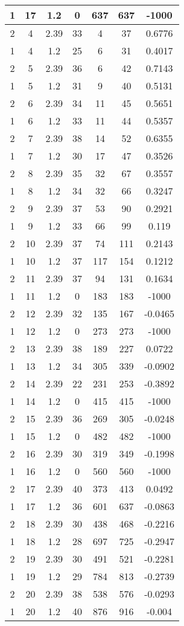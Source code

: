 \documentclass[letterpaper, 12pt]{article}
\begin{document}
\begin{longtable}{|c|c|c|c|c|c|c|}
\hline
1 & 17 & 1.2 & 0 & 637 & 637 & -1000 \\
\hline
2 & 4 & 2.39 & 33 & 4 & 37 & 0.6776 \\
\hline
1 & 4 & 1.2 & 25 & 6 & 31 & 0.4017 \\
\hline
2 & 5 & 2.39 & 36 & 6 & 42 & 0.7143 \\
\hline
1 & 5 & 1.2 & 31 & 9 & 40 & 0.5131 \\
\hline
2 & 6 & 2.39 & 34 & 11 & 45 & 0.5651 \\
\hline
1 & 6 & 1.2 & 33 & 11 & 44 & 0.5357 \\
\hline
2 & 7 & 2.39 & 38 & 14 & 52 & 0.6355 \\
\hline
1 & 7 & 1.2 & 30 & 17 & 47 & 0.3526 \\
\hline
2 & 8 & 2.39 & 35 & 32 & 67 & 0.3557 \\
\hline
1 & 8 & 1.2 & 34 & 32 & 66 & 0.3247 \\
\hline
2 & 9 & 2.39 & 37 & 53 & 90 & 0.2921 \\
\hline
1 & 9 & 1.2 & 33 & 66 & 99 & 0.119 \\
\hline
2 & 10 & 2.39 & 37 & 74 & 111 & 0.2143 \\
\hline
1 & 10 & 1.2 & 37 & 117 & 154 & 0.1212 \\
\hline
2 & 11 & 2.39 & 37 & 94 & 131 & 0.1634 \\
\hline
1 & 11 & 1.2 & 0 & 183 & 183 & -1000 \\
\hline
2 & 12 & 2.39 & 32 & 135 & 167 & -0.0465 \\
\hline
1 & 12 & 1.2 & 0 & 273 & 273 & -1000 \\
\hline
2 & 13 & 2.39 & 38 & 189 & 227 & 0.0722 \\
\hline
1 & 13 & 1.2 & 34 & 305 & 339 & -0.0902 \\
\hline
2 & 14 & 2.39 & 22 & 231 & 253 & -0.3892 \\
\hline
1 & 14 & 1.2 & 0 & 415 & 415 & -1000 \\
\hline
2 & 15 & 2.39 & 36 & 269 & 305 & -0.0248 \\
\hline
1 & 15 & 1.2 & 0 & 482 & 482 & -1000 \\
\hline
2 & 16 & 2.39 & 30 & 319 & 349 & -0.1998 \\
\hline
1 & 16 & 1.2 & 0 & 560 & 560 & -1000 \\
\hline
2 & 17 & 2.39 & 40 & 373 & 413 & 0.0492 \\
\hline
1 & 17 & 1.2 & 36 & 601 & 637 & -0.0863 \\
\hline
2 & 18 & 2.39 & 30 & 438 & 468 & -0.2216 \\
\hline
1 & 18 & 1.2 & 28 & 697 & 725 & -0.2947 \\
\hline
2 & 19 & 2.39 & 30 & 491 & 521 & -0.2281 \\
\hline
1 & 19 & 1.2 & 29 & 784 & 813 & -0.2739 \\
\hline
2 & 20 & 2.39 & 38 & 538 & 576 & -0.0293 \\
\hline
1 & 20 & 1.2 & 40 & 876 & 916 & -0.004 \\
\hline
\end{longtable}
\end{document}
